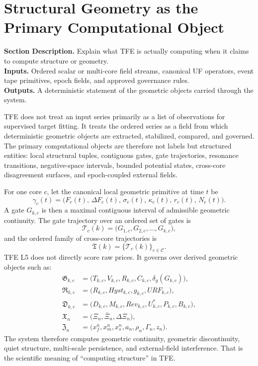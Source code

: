 \documentclass[11pt]{report}
\newcommand{\meta}[3]{\textbf{Section Description.} #1\\
\textbf{Inputs.} #2\\
\textbf{Outputs.} #3\par}
\begin{document}
\section{Structural Geometry as the Primary Computational Object}
\meta{Explain what TFE is actually computing when it claims to compute structure or geometry.}{Ordered scalar or multi-core field streams, canonical UF operators, event tape primitives, epoch fields, and approved governance rules.}{A deterministic statement of the geometric objects carried through the system.}

TFE does not treat an input series primarily as a list of observations for supervised target fitting. It treats the ordered series as a field from which deterministic geometric objects are extracted, stabilized, compared, and governed. The primary computational objects are therefore not labels but structured entities: local structural tuples, contiguous gates, gate trajectories, resonance transitions, negative-space intervals, bounded potential states, cross-core disagreement surfaces, and epoch-coupled external fields.

For one core $c$, let the canonical local geometric primitive at time $t$ be
\[
\gamma_c(t)=\big(F_c(t),\,\Delta F_c(t),\,\sigma_c(t),\,\kappa_c(t),\,r_c(t),\,N_c(t)\big).
\]
A gate $G_{k,c}$ is then a maximal contiguous interval of admissible geometric continuity. The gate trajectory over an ordered set of gates is
\[
\mathcal{T}_{c}(k)=\big(G_{1,c},G_{2,c},\dots,G_{k,c}\big),
\]
and the ordered family of cross-core trajectories is
\[
\mathfrak{T}(k)=\{\mathcal{T}_{c}(k)\}_{c\in\mathcal{C}}.
\]
TFE L5 does not directly score raw prices. It governs over derived geometric objects such as:
\begin{align*}
\mathfrak{G}_{k,c} &= \big(T_{k,c},V_{k,c},R_{k,c},C_{k,c},\delta_g(G_{k,c})\big),\\
\mathfrak{R}_{k,c} &= \big(R_{k,c},Hyst_{k,c},g_{k,c},URF_{k,c}\big),\\
\mathfrak{D}_{k,c} &= \big(D_{k,c},M_{k,c},Rev_{k,c},U^{\ast}_{k,c},P_{k,c},B_{k,c}\big),\\
\mathfrak{X}_{n} &= \big(\Xi_n,\bar\Xi_n,\Delta\Xi_n\big),\\
\mathfrak{Z}_{n} &= \big(x_f^n,x_m^n,x_s^n,a_n,\rho_n,\Gamma_n,z_n\big).
\end{align*}
The system therefore computes geometric continuity, geometric discontinuity, quiet structure, multi-scale persistence, and external-field interference. That is the scientific meaning of ``computing structure'' in TFE.
\end{document}
